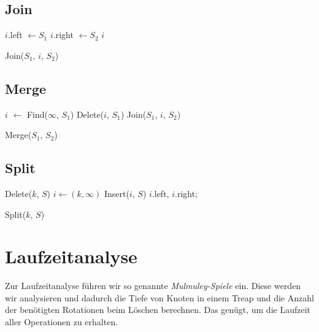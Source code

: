 \documentclass[a4paper]{scrreprt}
\theoremstyle{definition}
\begin{document}
\subsection{Join}
\label{sec:join}

\begin{algorithm}[H]
		$i$.left $\gets S_1$ \;
		$i$.right $\gets S_2$ \;
		\Return $i$
	\caption{Join($S_1$, $i$, $S_2$)}
\end{algorithm}

\subsection{Merge}
\label{sec:merge}

\begin{algorithm}[H]
		$i$ $\gets$ Find($\infty$, $S_1$) 
		Delete($i$, $S_1$) \;
		\Return Join($S_1$, $i$, $S_2$) \;
	\caption{Merge($S_1$, $S_2$)}
\end{algorithm}

\subsection{Split}
\label{sec:split}

\begin{algorithm}[H]
		Delete($k$, $S$) 
		$i \gets (k, \infty)$ \;
		Insert($i$, $S$) \;
		\Return $i$.left, $i$.right;
	\caption{Split($k$, $S$)}
\end{algorithm}

\section{Laufzeitanalyse}
\label{sec:runtime}
Zur Laufzeitanalyse führen wir so genannte \emph{Mulmuley-Spiele} ein.
Diese werden wir analysieren und dadurch die Tiefe von Knoten in einem Treap und die Anzahl der benötigten Rotationen beim Löschen berechnen.
Das genügt, um die Laufzeit aller Operationen zu erhalten.
\end{document}

